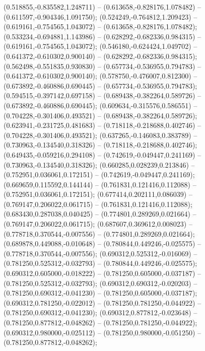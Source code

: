  (0.518855,-0.835582,1.248711) -- (0.613658,-0.828176,1.078482) -- (0.611597,-0.904346,1.091750);
 (0.524249,-0.764812,1.209423) -- (0.619161,-0.754565,1.043072) -- (0.613658,-0.828176,1.078482);
 (0.533234,-0.694881,1.143986) -- (0.628292,-0.682336,0.984315) -- (0.619161,-0.754565,1.043072);
 (0.546180,-0.624424,1.049702) -- (0.641372,-0.610302,0.900140) -- (0.628292,-0.682336,0.984315);
 (0.562498,-0.551835,0.930830) -- (0.657734,-0.536955,0.794783) -- (0.641372,-0.610302,0.900140);
 (0.578750,-0.476007,0.812300) -- (0.673892,-0.460886,0.690445) -- (0.657734,-0.536955,0.794783);
 (0.594515,-0.397142,0.697158) -- (0.689438,-0.382264,0.589726) -- (0.673892,-0.460886,0.690445);
 (0.609634,-0.315576,0.586551) -- (0.704228,-0.301406,0.493521) -- (0.689438,-0.382264,0.589726);
 (0.623941,-0.231725,0.481683) -- (0.718118,-0.218688,0.402746) -- (0.704228,-0.301406,0.493521);
 (0.637265,-0.146083,0.383789) -- (0.730963,-0.134540,0.318326) -- (0.718118,-0.218688,0.402746);
 (0.649435,-0.059216,0.294108) -- (0.742619,-0.049447,0.241169) -- (0.730963,-0.134540,0.318326);
 (0.660285,0.028239,0.213846) -- (0.752951,0.036061,0.172151) -- (0.742619,-0.049447,0.241169);
 (0.669659,0.115592,0.144144) -- (0.761831,0.121416,0.112088) -- (0.752951,0.036061,0.172151);
 (0.677414,0.202111,0.086039) -- (0.769147,0.206022,0.061715) -- (0.761831,0.121416,0.112088);
 (0.683430,0.287038,0.040425) -- (0.774801,0.289269,0.021664) -- (0.769147,0.206022,0.061715);
 (0.687607,0.369612,0.008023) -- (0.778718,0.370544,-0.007556) -- (0.774801,0.289269,0.021664);
 (0.689878,0.449088,-0.010648) -- (0.780844,0.449246,-0.025575) -- (0.778718,0.370544,-0.007556);
 (0.690312,0.525312,-0.016069) -- (0.781250,0.525312,-0.032793) -- (0.780844,0.449246,-0.025575);
 (0.690312,0.605000,-0.018222) -- (0.781250,0.605000,-0.037187) -- (0.781250,0.525312,-0.032793);
 (0.690312,0.690312,-0.020203) -- (0.781250,0.690312,-0.041230) -- (0.781250,0.605000,-0.037187);
 (0.690312,0.781250,-0.022012) -- (0.781250,0.781250,-0.044922) -- (0.781250,0.690312,-0.041230);
 (0.690312,0.877812,-0.023648) -- (0.781250,0.877812,-0.048262) -- (0.781250,0.781250,-0.044922);
 (0.690312,0.980000,-0.025112) -- (0.781250,0.980000,-0.051250) -- (0.781250,0.877812,-0.048262);
